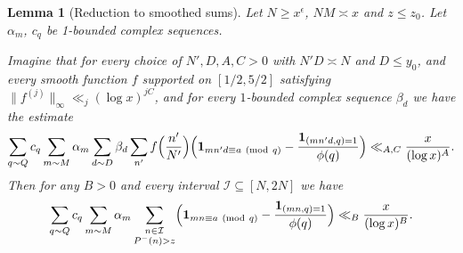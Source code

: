 \documentclass[10pt]{amsart}
\theoremstyle{plain}
\newtheorem{lmm}[thrm]{Lemma}
\numberwithin{equation}{section}
\newcommand{\Mod}[1]{\ (\mathrm{mod}\ #1)}
\begin{document}
%
%
%
%
%
%
%
%
\begin{lmm}[Reduction to smoothed sums]\label{lmm:SmoothReduction}
Let $N\ge x^\epsilon$, $NM\asymp x$ and $z\le z_0$. Let $\alpha_m$, $c_q$ be 1-bounded complex sequences.

Imagine that for every choice of $N',D,A,C>0$ with $N' D\asymp N$ and $D\le y_0$, and every smooth function $f$ supported on $[1/2,5/2]$ satisfying $\|f^{(j)}\|_\infty\ll_j (\log{x})^{j C}$, and for every $1$-bounded complex sequence $\beta_d$ we have the estimate
\[
\sum_{q\sim Q} c_q\sum_{m\sim M}\alpha_m\sum_{d\sim D}\beta_d\sum_{n'}f\Bigl(\frac{n'}{N'}\Bigr)\Bigl(\mathbf{1}_{m n' d\equiv a\Mod{q}}-\frac{\mathbf{1}_{(m n' d,q)=1}}{\phi(q)}\Bigr)\ll_{A,C} \frac{x}{(\log{x})^A}.
\]
Then for any $B>0$ and every interval $\mathcal{I}\subseteq [N,2N]$ we have
\[
\sum_{q\sim Q}c_q \sum_{m\sim M}\alpha_m\sum_{\substack{n\in\mathcal{I}\\ P^-(n)>z}}\Bigl(\mathbf{1}_{mn\equiv a\Mod{q}}-\frac{\mathbf{1}_{(m n,q)=1}}{\phi(q)}\Bigr)\ll_{B} \frac{x}{(\log{x})^B}.
\]
\end{lmm}
\end{document}
